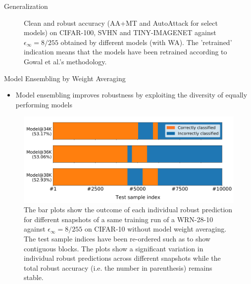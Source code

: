 \begin{frame}{Generalization}
\begin{figure}
\begin{minipage}[c]{0.45\linewidth}
            \end{minipage}
            \begin{minipage}[c]{0.4\linewidth}
                \caption{Clean and robust accuracy (AA+MT and AutoAttack for select models) on CIFAR-100, SVHN and TINY-IMAGENET against $\epsilon_\infty = 8/255$ obtained by different models (with WA). The ’retrained’ indication means that the models have been retrained according to Gowal et al.’s methodology.}\label{fig:gen_data}
            \end{minipage}
    \end{figure}
\end{frame}

\begin{frame}{Model Ensembling by Weight Averaging}
    \begin{itemize}
        \item Model ensembling improves robustness by exploiting the diversity of equally performing models 
    \end{itemize}
    \begin{figure}
        \centering
        \includegraphics[width=\linewidth]{pic/fig 7.png}
        \caption{The bar plots show the outcome of each individual robust prediction for different snapshots of a same training run of a WRN-28-10 against $\epsilon_\infty = 8/255$ on CIFAR-10 without model weight averaging. The test sample indices have been re-ordered such as to show contiguous blocks. The plots show a significant variation in individual robust predictions across different snapshots while the total robust accuracy (i.e. the number in parenthesis) remains stable.}
        \label{fig:fig7}
    \end{figure}
\end{frame}


